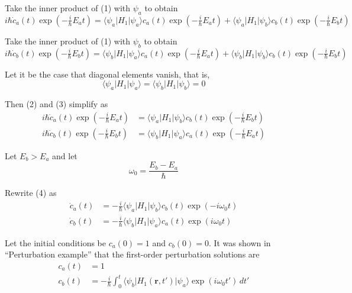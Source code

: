 Take the inner product of (1) with $\psi_a$ to obtain
\begin{equation*}
i\hbar\dot c_a(t)\exp\left(-\tfrac{i}{\hbar}E_at\right)
=\langle\psi_a|H_1|\psi_a\rangle c_a(t)\exp\left(-\tfrac{i}{\hbar}E_at\right)
+\langle\psi_a|H_1|\psi_b\rangle c_b(t)\exp\left(-\tfrac{i}{\hbar}E_bt\right)
\tag{2}
\end{equation*}

Take the inner product of (1) with $\psi_b$ to obtain
\begin{equation*}
i\hbar\dot c_b(t)\exp\left(-\tfrac{i}{\hbar}E_bt\right)
=\langle\psi_b|H_1|\psi_a\rangle c_a(t)\exp\left(-\tfrac{i}{\hbar}E_at\right)
+\langle\psi_b|H_1|\psi_b\rangle c_b(t)\exp\left(-\tfrac{i}{\hbar}E_bt\right)
\tag{3}
\end{equation*}

Let it be the case that diagonal elements vanish, that is,
\begin{equation*}
\langle\psi_a|H_1|\psi_a\rangle=\langle\psi_b|H_1|\psi_b\rangle=0
\end{equation*}

Then (2) and (3) simplify as
\begin{equation*}
\begin{aligned}
i\hbar\dot c_a(t)\exp\left(-\tfrac{i}{\hbar}E_at\right)
&=\langle\psi_a|H_1|\psi_b\rangle c_b(t)\exp\left(-\tfrac{i}{\hbar}E_bt\right)
\\
i\hbar\dot c_b(t)\exp\left(-\tfrac{i}{\hbar}E_bt\right)
&=\langle\psi_b|H_1|\psi_a\rangle c_a(t)\exp\left(-\tfrac{i}{\hbar}E_at\right)
\end{aligned}
\tag{4}
\end{equation*}

Let $E_b>E_a$ and let
\begin{equation*}
\omega_0=\frac{E_b-E_a}{\hbar}
\end{equation*}

Rewrite (4) as
\begin{align*}
\dot c_a(t)&=-\frac{i}{\hbar}\langle\psi_a|H_1|\psi_b\rangle c_b(t)\exp(-i\omega_0t)
\\
\dot c_b(t)&=-\frac{i}{\hbar}\langle\psi_b|H_1|\psi_a\rangle c_a(t)\exp(i\omega_0t)
\end{align*}

Let the initial conditions be $c_a(0)=1$ and $c_b(0)=0$.
It was shown in ``Perturbation example'' that the first-order perturbation solutions are
\begin{align*}
c_a(t)&=1
\\
c_b(t)&=-\frac{i}{\hbar}\int_0^t
\langle\psi_b|H_1(\mathbf r,t')|\psi_a\rangle\exp(i\omega_0t')\,dt'
\end{align*}


